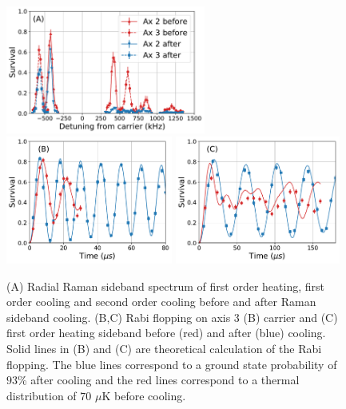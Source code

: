 \documentclass[aps,prl,twocolumn,groupedaddress]{revtex4-1}
\begin{document}
\begin{figure}
  \includegraphics[height=4.2cm]{imgs/spectrum_r.pdf}
  \includegraphics[height=4.2cm]{imgs/rabi_flop_r3_0.pdf}
  \includegraphics[height=4.2cm]{imgs/rabi_flop_r3_p1.pdf}
  \caption{(A) Radial Raman sideband spectrum of first order heating, first order cooling and
    second order cooling before and after Raman sideband cooling.
    (B,C) Rabi flopping on axis 3 (B) carrier and (C) first order heating sideband
    before (red) and after (blue) cooling.
    Solid lines in (B) and (C) are theoretical calculation of the Rabi flopping.
    The blue lines correspond to a ground state probability of $93$\% after cooling and
    the red lines correspond to a thermal distribution of $70$ $\mu$K before cooling.
    \label{f-radial}}
\end{figure}
\end{document}
